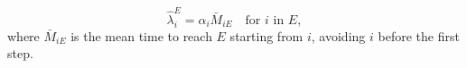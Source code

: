 $$\hat{\lambda}_i^E = \alpha_i \bar{M}_{iE} \quad \text{for } i \text{ in } E,$$
where $\bar{M}_{iE}$ is the mean time to reach $E$ starting from $i$, avoiding $i$ before the first step.
